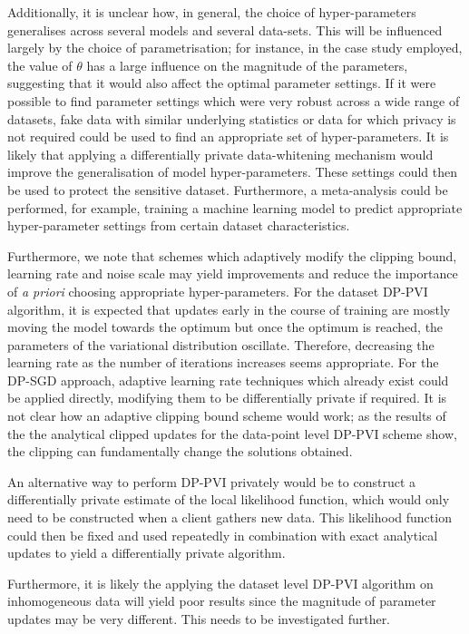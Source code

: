 Additionally, it is unclear how, in general, the choice of hyper-parameters generalises across several models and several data-sets. This will be influenced largely by the choice of parametrisation; for instance, in the case study employed, the value of $\theta$ has a large influence on the magnitude of the parameters, suggesting that it would also affect the optimal parameter settings. If it were possible to find parameter settings which were very robust across a wide range of datasets, fake data with similar underlying statistics or data for which privacy is not required could be used to find an appropriate set of hyper-parameters. It is likely that applying a differentially private data-whitening mechanism would improve the generalisation of model hyper-parameters. These settings could then be used to protect the sensitive dataset. Furthermore, a meta-analysis could be performed, for example, training a machine learning model to predict appropriate hyper-parameter settings from certain dataset characteristics. 

Furthermore, we note that schemes which adaptively modify the clipping bound, learning rate and noise scale may yield improvements and reduce the importance of \emph{a priori} choosing appropriate hyper-parameters. For the dataset DP-PVI algorithm, it is expected that updates early in the course of training are mostly moving the model towards the optimum but once the optimum is reached, the parameters of the variational distribution oscillate. Therefore, decreasing the learning rate as the number of iterations increases seems appropriate. For the DP-SGD approach, adaptive learning rate techniques which already exist could be applied directly, modifying them to be differentially private if required. It is not clear how an adaptive clipping bound scheme would work; as the results of the the analytical clipped updates for the data-point level DP-PVI scheme show, the clipping can fundamentally change the solutions obtained.

An alternative way to perform DP-PVI privately would be to construct a differentially private estimate of the local likelihood function, which would only need to be constructed when a client gathers new data. This likelihood function could then be fixed and used repeatedly in combination with exact analytical updates to yield a differentially private algorithm.

Furthermore, it is likely the applying the dataset level DP-PVI algorithm on inhomogeneous data will yield poor results since the magnitude of parameter updates may be very different. This needs to be investigated further. 